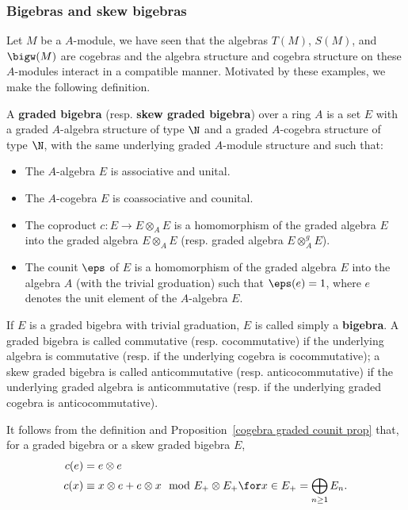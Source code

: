 \subsubsection{Bigebras and skew bigebras}
Let $M$ be a $A$-module, we have seen that the algebras $T(M)$, $S(M)$, and $\bigw(M)$ are cogebras and the algebra structure and cogebra structure on these $A$-modules interact in a compatible manner. Motivated by these examples, we make the following definition.
\begin{definition}
A \textbf{graded bigebra} (resp. \textbf{skew graded bigebra}) over a ring $A$ is a set $E$ with a graded $A$-algebra structure of type $\N$ and a graded $A$-cogebra structure of type $\N$, with the same underlying graded $A$-module structure and such that:
\begin{itemize}
\item The $A$-algebra $E$ is associative and unital.
\item The $A$-cogebra $E$ is coassociative and counital.
\item The coproduct $c:E\to E\otimes_AE$ is a homomorphism of the graded algebra $E$ into the graded algebra $E\otimes_AE$ (resp. graded algebra $E\otimes_A^gE$).
\item The counit $\eps$ of $E$ is a homomorphism of the graded algebra $E$ into the algebra $A$ (with the trivial groduation) such that $\eps(e)=1$, where $e$ denotes the unit element of the $A$-algebra $E$.
\end{itemize}
\end{definition}
If $E$ is a graded bigebra with trivial graduation, $E$ is called simply a \textbf{bigebra}. A graded bigebra is called commutative (resp. cocommutative) if the underlying algebra is commutative (resp. if the underlying cogebra is cocommutative); a skew graded bigebra is called anticommutative (resp. anticocommutative) if the underlying graded algebra is anticommutative (resp. if the underlying graded cogebra is anticocommutative).\par
It follows from the definition and Proposition~\ref{cogebra graded counit prop} that, for a graded bigebra or a skew graded bigebra $E$,
\begin{equation}\label{bigebra graded unit element under coproduct prop}
\begin{aligned}
c(e)&=e\otimes e\\
c(x)&\equiv x\otimes e+e\otimes x\mod E_+\otimes E_+\for x\in E_+=\bigoplus_{n\geq 1}E_n.
\end{aligned}
\end{equation}
